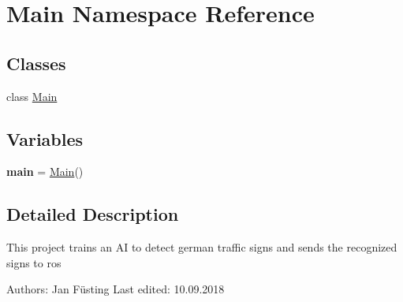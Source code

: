 \hypertarget{namespace_main}{}\section{Main Namespace Reference}
\label{namespace_main}
\subsection*{Classes}
\begin{DoxyCompactItemize}
\item 
class \mbox{\hyperlink{class_main_1_1_main}{Main}}
\end{DoxyCompactItemize}
\subsection*{Variables}
\begin{DoxyCompactItemize}
\item 
\mbox{\label{namespace_main_a273efe7b2fb62996049eaeeb06c8abde}} 
{\bfseries main} = \mbox{\hyperlink{class_main_1_1_main}{Main}}()
\end{DoxyCompactItemize}


\subsection{Detailed Description}
\begin{DoxyVerb}This project trains an AI to detect german traffic signs and sends the recognized signs to ros

Authors:        Jan Füsting
Last edited:    10.09.2018
\end{DoxyVerb}
 